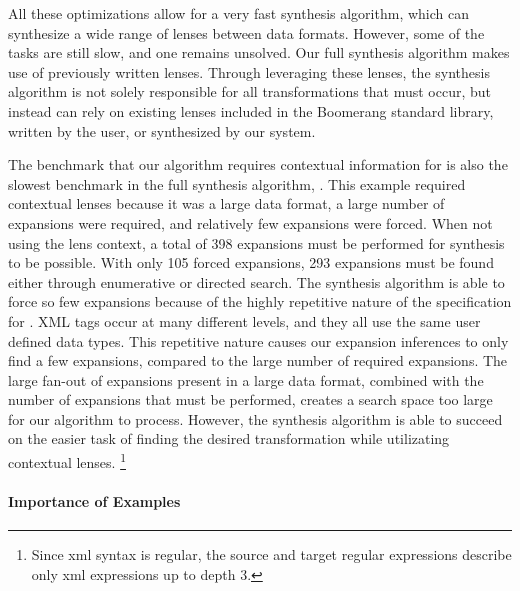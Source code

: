 \documentclass[acmsmall]{acmart}
\begin{document}
All these optimizations allow for a very fast synthesis algorithm, which can
synthesize a wide range of lenses between data formats.  However, some of the
tasks are still slow, and one remains unsolved.
Our full synthesis algorithm makes use of previously written lenses.
Through leveraging these lenses, the synthesis algorithm is not solely
responsible for all transformations that must occur, but instead can rely on
existing lenses included in the Boomerang standard library, written by
the user, or synthesized by our system.

The benchmark that our algorithm requires contextual information for is also
the slowest benchmark in the full synthesis algorithm, .  This
example required contextual lenses because it was a large data format, a large
number of expansions were required, and relatively few expansions were forced.
When not using the lens context, a total of 398
expansions must be performed for synthesis to be possible.
With only 105 forced expansions, 293 expansions must be found either through
enumerative or directed search.
The synthesis algorithm is able to force so few expansions because of the highly
repetitive nature of the specification for .  XML tags occur at many
different levels, and they all use the same user defined data types.
This repetitive nature causes our
expansion inferences to only find a few expansions, compared to the large number
of required expansions.  The large fan-out of expansions present in a large data
format, combined with the number of expansions that must be performed, creates
a search space too large for our algorithm to process.  However, the
synthesis algorithm is able to succeed on the easier task of finding the desired
transformation while utilizating contextual lenses. 
\footnote{Since xml syntax is regular, the source and target regular
  expressions describe only xml expressions up to depth 3.}

\paragraph*{Importance of Examples}
\end{document}
